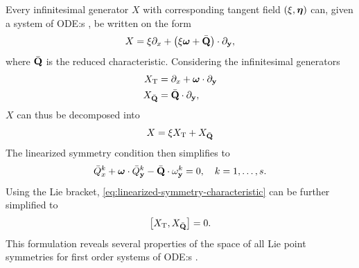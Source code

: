 Every infinitesimal generator \(X\) with corresponding tangent field \((\xi, \vb*{\eta})\) can, given a system of ODE:s , be written on the form
\begin{equation}
  X = \xi \partial_x + \left(\xi \vb*{\omega} + \bar{\vb{Q}}\right) \cdot \partial_{\vb{y}},
\end{equation}
where \(\bar{\vb{Q}}\) is the reduced characteristic.
Considering the infinitesimal generators
\begin{align}
  X_{\text{T}} &= \partial_x + \vb*{\omega} \cdot \partial_{\vb{y}} \\
  X_{\bar{\vb{Q}}} &= \bar{\vb{Q}} \cdot \partial_{\vb{y}},
\end{align}
\(X\) can thus be decomposed into
\begin{equation} \label{eq:inf-gen-decomposition}
  X = \xi X_{\text{T}} + X_{\bar{\vb{Q}}}
\end{equation}
The linearized symmetry condition  then simplifies to
\begin{equation} \label{eq:linearized-symmetry-characteristic}
  \bar{Q}_x^k + \vb*{\omega} \cdot \bar{Q}_{\vb{y}}^k - \bar{\vb{Q}} \cdot \omega_{\vb{y}}^k = 0 \qc k = 1, \dots, s.
\end{equation}
Using the Lie bracket, \cref{eq:linearized-symmetry-characteristic} can be further simplified to
\begin{equation} \label{eq:linearized-symmetry-bracket}
  \comm{X_{\text{T}}}{X_{\bar{\vb{Q}}}} = 0.
\end{equation}
This formulation reveals several properties of the space of all Lie point symmetries for first order systems of ODE:s .

